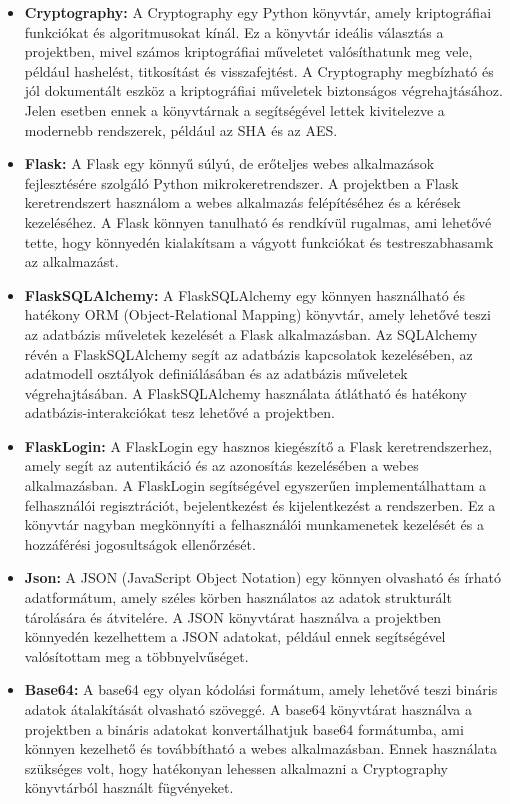 \begin{itemize}
  	\item\textbf{Cryptography:}
A Cryptography egy Python könyvtár, amely kriptográfiai funkciókat és algoritmusokat kínál. Ez a könyvtár ideális választás a projektben, mivel számos kriptográfiai műveletet valósíthatunk meg vele, például hashelést, titkosítást és visszafejtést. A Cryptography megbízható és jól dokumentált eszköz a kriptográfiai műveletek biztonságos végrehajtásához. Jelen esetben ennek a könyvtárnak a segítségével lettek kivitelezve a modernebb rendszerek, például az SHA és az AES.

 	 \item\textbf{Flask:}
A Flask egy könnyű súlyú, de erőteljes webes alkalmazások fejlesztésére szolgáló Python mikrokeretrendszer. A projektben a Flask keretrendszert használom a webes alkalmazás felépítéséhez és a kérések kezeléséhez. A Flask könnyen tanulható és rendkívül rugalmas, ami lehetővé tette, hogy könnyedén kialakítsam a vágyott funkciókat és testreszabhasamk az alkalmazást.

 	 \item\textbf{FlaskSQLAlchemy:}
A FlaskSQLAlchemy egy könnyen használható és hatékony ORM (Object-Relational Mapping) könyvtár, amely lehetővé teszi az adatbázis műveletek kezelését a Flask alkalmazásban. Az SQLAlchemy révén a FlaskSQLAlchemy segít az adatbázis kapcsolatok kezelésében, az adatmodell osztályok definiálásában és az adatbázis műveletek végrehajtásában. A FlaskSQLAlchemy használata átlátható és hatékony adatbázis-interakciókat tesz lehetővé a projektben.

 	 \item\textbf{FlaskLogin:}
A FlaskLogin egy hasznos kiegészítő a Flask keretrendszerhez, amely segít az autentikáció és az azonosítás kezelésében a webes alkalmazásban. A FlaskLogin segítségével egyszerűen implementálhattam a felhasználói regisztrációt, bejelentkezést és kijelentkezést a rendszerben. Ez a könyvtár nagyban megkönnyíti a felhasználói munkamenetek kezelését és a hozzáférési jogosultságok ellenőrzését.

 	 \item\textbf{Json:}
A JSON (JavaScript Object Notation) egy könnyen olvasható és írható adatformátum, amely széles körben használatos az adatok strukturált tárolására és átvitelére. A JSON könyvtárat használva a projektben könnyedén kezelhettem a JSON adatokat, például ennek segítségével valósítottam meg a többnyelvűséget.

 	 \item\textbf{Base64:}
A base64 egy olyan kódolási formátum, amely lehetővé teszi bináris adatok átalakítását olvasható szöveggé. A base64 könyvtárat használva a projektben a bináris adatokat konvertálhatjuk base64 formátumba, ami könnyen kezelhető és továbbítható a webes alkalmazásban. Ennek használata szükséges volt, hogy hatékonyan lehessen alkalmazni a Cryptography könyvtárból használt fügvényeket.


\end{itemize}
